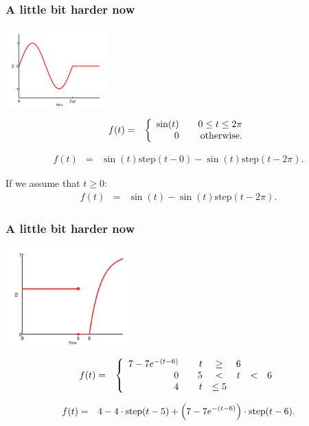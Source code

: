 \begin{frame}
  \frametitle{A little bit harder now}

  \centerline{\includegraphics[width=4cm]{img/stepEx5}}

  \begin{eqnarray*}
      f(t) & = & 
      \left\{
        \begin{array}{r@{\hspace{2em}}r}
          \sin(t) & 0 \leq t \leq 2\pi \\
          0 &  \mathrm{otherwise}.
        \end{array}
      \right.
  \end{eqnarray*}

  {
    \begin{eqnarray*}
      f(t) & = & \sin(t)\mathrm{step}(t-0) - \sin(t)\mathrm{step}(t-2\pi).
    \end{eqnarray*}
  }


  {
    If we assume that $t\geq 0$:
    \begin{eqnarray*}
      f(t) & = & \sin(t) - \sin(t)\mathrm{step}(t-2\pi).
    \end{eqnarray*}
  }


\end{frame}



\begin{frame}
  \frametitle{A little bit harder now}

  \centerline{\includegraphics[width=5cm]{img/stepEx6}}

  \begin{eqnarray*}
      f(t) & = & 
      \left\{
        \begin{array}{r@{\hspace{2em}}rcccl}
          7-7e^{-(t-6)} & t & \geq & 6 \\
          0 & 5 & < & t & < & 6 \\
          4 & t & \leq 5 
        \end{array}
      \right.
  \end{eqnarray*}

  {
    \begin{eqnarray*}
      f(t) & = & 4 - 4\cdot\mathrm{step}(t-5) + \left( 7-7e^{-(t-6)}\right)\cdot\mathrm{step}(t-6).
    \end{eqnarray*}
  }


\end{frame}


